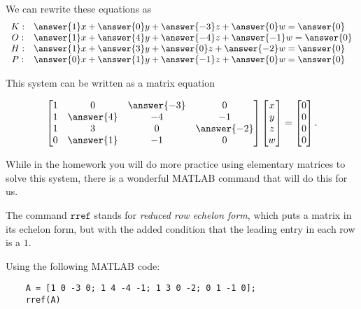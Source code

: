 \documentclass{ximera}
\begin{document}
\begin{exploration}
\begin{example}
\begin{solution}
  We can rewrite these equations as
  \begin{equation*}
    \begin{array}{cl}
      K: & \answer{1}x + \answer{0}y + \answer{-3}z + \answer{0}w = \answer{0} \\
      O: & \answer{1}x + \answer{4}y + \answer{-4}z + \answer{-1}w = \answer{0} \\
      H: & \answer{1}x + \answer{3}y + \answer{0}z + \answer{-2}w = \answer{0} \\
      P: & \answer{0}x + \answer{1}y + \answer{-1}z + \answer{0}w = \answer{0}
    \end{array}
  \end{equation*}

  This system can be written as a matrix equation

  \begin{equation*}
    \begin{bmatrix}
      1 & 0 & \answer{-3} & 0 \\
      1 & \answer{4} & -4 & -1 \\
      1 & 3 & 0 & \answer{-2} \\
      0 & \answer{1} & -1 & 0
    \end{bmatrix}
    \begin{bmatrix}
      x \\
      y \\
      z \\
      w
    \end{bmatrix}
    =
    \begin{bmatrix}
      0 \\
      0 \\
      0 \\
      0
    \end{bmatrix}.
  \end{equation*}

  While in the homework you will do more practice using elementary matrices to solve this system, there is a wonderful MATLAB command that will do this for us. 

  The command $\texttt{rref}$ stands for \emph{reduced row echelon form}, which puts a matrix in its echelon form, but with the added condition that the leading entry in each row is a $1$.

  Using the following MATLAB code:

  \begin{verbatim}
    A = [1 0 -3 0; 1 4 -4 -1; 1 3 0 -2; 0 1 -1 0];
    rref(A)
  \end{verbatim}


\end{solution}
\end{example}
\end{exploration}
\end{document}
